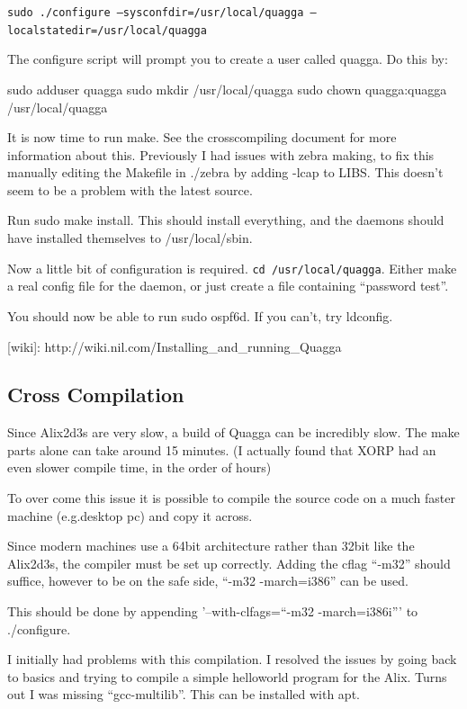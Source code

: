 \texttt{sudo \@./configure --sysconfdir=/usr/local/quagga --localstatedir=/usr/local/quagga}

The configure script will prompt you to create a user called quagga. Do this by:

sudo adduser quagga
sudo mkdir /usr/local/quagga
sudo chown quagga:quagga /usr/local/quagga

It is now time to run make. See the crosscompiling document for more
information about this. Previously I had issues with zebra making, to fix this
manually editing the Makefile in \@./zebra by adding -lcap to LIBS\@. This doesn't
seem to be a problem with the latest source.

Run sudo make install. This should install everything, and the daemons
should have installed themselves to /usr/local/sbin.

Now a little bit of configuration is required. \texttt{cd /usr/local/quagga}.
Either make a real config file for the daemon, or just create a file containing ``password test''.


You should now be able to run sudo ospf6d. If you can't, try ldconfig.


[wiki]: http://wiki.nil.com/Installing\_and\_running\_Quagga

\subsection{Cross Compilation}

Since Alix2d3s are very slow, a build of Quagga can be incredibly slow. The make parts
alone can take around 15 minutes. (I actually found that XORP had an even slower
compile time, in the order of hours) 

To over come this issue it is possible to compile the source code on a much
faster machine (e.g.\@ desktop pc) and copy it across. 

Since modern machines use a 64bit architecture rather than 32bit like the
Alix2d3s, the compiler must be set up correctly. Adding the cflag ``-m32'' should
suffice, however to be on the safe side, ``-m32 -march=i386'' can be used. 

This should be done by appending '--with-clfags=``-m32 -march=i386i''' to \@./configure.

I initially had problems with this compilation. I resolved the issues by going
back to basics and trying to compile a simple helloworld program for the Alix.
Turns out I was missing ``gcc-multilib''. This can be installed with apt.


